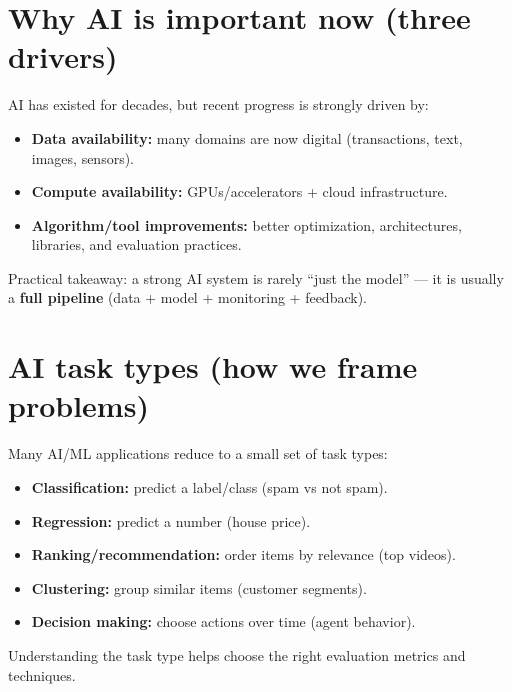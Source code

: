 \documentclass[11pt]{article}
\begin{document}
\section{Why AI is important now (three drivers)}
AI has existed for decades, but recent progress is strongly driven by:
\begin{itemize}[leftmargin=*]
  \item \textbf{Data availability:} many domains are now digital (transactions, text, images, sensors).
  \item \textbf{Compute availability:} GPUs/accelerators + cloud infrastructure.
  \item \textbf{Algorithm/tool improvements:} better optimization, architectures, libraries, and evaluation practices.
\end{itemize}
Practical takeaway: a strong AI system is rarely ``just the model'' --- it is usually a \textbf{full pipeline} (data + model + monitoring + feedback).

\section{AI task types (how we frame problems)}
Many AI/ML applications reduce to a small set of task types:
\begin{itemize}[leftmargin=*]
  \item \textbf{Classification:} predict a label/class (spam vs not spam).
  \item \textbf{Regression:} predict a number (house price).
  \item \textbf{Ranking/recommendation:} order items by relevance (top videos).
  \item \textbf{Clustering:} group similar items (customer segments).
  \item \textbf{Decision making:} choose actions over time (agent behavior).
\end{itemize}
Understanding the task type helps choose the right evaluation metrics and techniques.
\end{document}
